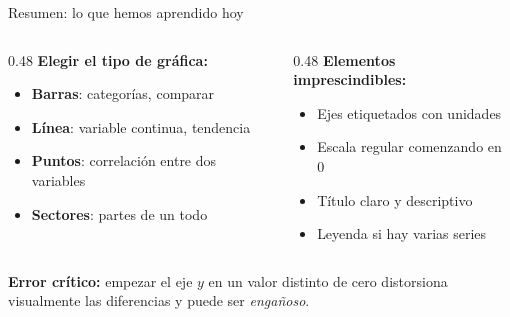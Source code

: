 \documentclass[aspectratio=169, 10pt, spanish]{beamer}
\begin{document}
\begin{frame}{Resumen: lo que hemos aprendido hoy}
  \begin{resumenbox}
    \begin{columns}[T]
      \begin{column}{0.48\textwidth}
        \textbf{Elegir el tipo de gráfica:}
        \begin{itemize}
          \item \textbf{Barras}: categorías, comparar
          \item \textbf{Línea}: variable continua, tendencia
          \item \textbf{Puntos}: correlación entre dos variables
          \item \textbf{Sectores}: partes de un todo
        \end{itemize}
      \end{column}
      \begin{column}{0.48\textwidth}
        \textbf{Elementos imprescindibles:}
        \begin{itemize}
          \item Ejes etiquetados con unidades
          \item Escala regular comenzando en 0
          \item Título claro y descriptivo
          \item Leyenda si hay varias series
        \end{itemize}
      \end{column}
    \end{columns}

    \vspace{0.25cm}
    \separador
    \vspace{0.15cm}
    \AlmFontSmall
    \textbf{Error crítico:} empezar el eje $y$ en un valor
    distinto de cero distorsiona visualmente las diferencias y
    puede ser \textit{engañoso}.
  \end{resumenbox}

  \vspace{0.2cm}
  \begin{center}
    \quad
    \quad
  \end{center}
\end{frame}
\end{document}
